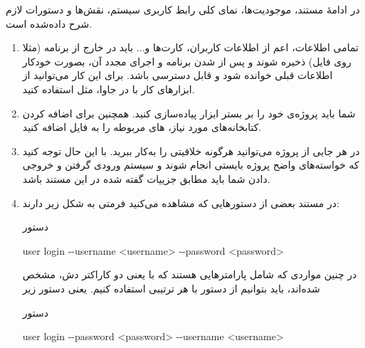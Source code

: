 \documentclass[]{article}
\begin{document}
در ادامهٔ مستند، موجودیت‌ها، نمای کلی رابط کاربری سیستم، نقش‌ها و دستورات لازم شرح داده‌شده است.

\begin{enumerate}[label={نکته \arabic*:}]
\item
 تمامی اطلاعات، اعم از اطلاعات کاربران، کارت‌ها و... باید در خارج از برنامه (مثلا روی فایل) ذخیره شوند و پس از  شدن برنامه و اجرای مجدد آن، بصورت خودکار اطلاعات قبلی خوانده شود و قابل دسترسی باشد. برای این کار می‌توانید از ابزارهای کار با  در جاوا، مثل
  \href{https://www.tutorialspoint.com/gson/gson_quick_guide.htm}{\textcolor{blue}{}}
   استفاده‌ کنید.

\item
شما باید پروژه‌ی خود را بر بستر ابزار  پیاده‌سازی کنید. همچنین برای اضافه کردن کتابخانه‌های مورد نیاز،  های مربوطه را به فایل  اضافه کنید.




   

\item
در هر جایی از پروژه می‌توانید هرگونه خلاقیتی را به‌کار ببرید. با این حال توجه کنید که خواسته‌های واضح پروژه بایستی انجام شوند و سیستم ورودی گرفتن و خروجی دادن شما باید مطابق جزییات گفته شده در این مستند باشد.


\item
در مستند بعضی از دستور‌هایی که مشاهده می‌کنید فرمتی به شکل زیر دارند:

\begin{mybox}[colback=yellow]{دستور}
	
	
	\begin{latin}
		
	user login -{}-username <username> -{}-password <password>
		
	\end{latin}
	
\end{mybox}

در چنین مواردی که شامل پارامتر‌هایی هستند که با
\lr{-{}-}
یعنی دو کاراکتر دش، مشخص شده‌اند، باید بتوانیم از دستور با هر ترتیبی استفاده کنیم. یعنی دستور زیر

\begin{mybox}[colback=yellow]{دستور}
	
	
	\begin{latin}
		
		user login -{}-password <password> -{}-username <username> 
		
	\end{latin}
	

\end{mybox}
\end{enumerate}
\end{document}
